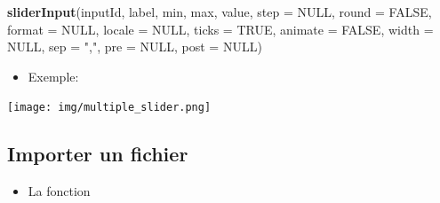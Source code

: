 \documentclass[
]{article}
\newenvironment{Shaded}{\begin{snugshade}}{\end{snugshade}}
\newcommand{\AttributeTok}[1]{\textcolor[rgb]{0.13,0.29,0.53}{#1}}
\newcommand{\CommentTok}[1]{\textcolor[rgb]{0.56,0.35,0.01}{\textit{#1}}}
\newcommand{\ConstantTok}[1]{\textcolor[rgb]{0.56,0.35,0.01}{#1}}
\newcommand{\DecValTok}[1]{\textcolor[rgb]{0.00,0.00,0.81}{#1}}
\newcommand{\FunctionTok}[1]{\textcolor[rgb]{0.13,0.29,0.53}{\textbf{#1}}}
\newcommand{\NormalTok}[1]{#1}
\newcommand{\StringTok}[1]{\textcolor[rgb]{0.31,0.60,0.02}{#1}}
\providecommand{\tightlist}{%
  \setlength{\itemsep}{0pt}\setlength{\parskip}{0pt}}
\begin{document}
\begin{Shaded}
\begin{Highlighting}[]
\FunctionTok{sliderInput}\NormalTok{(inputId, label, min, max, value, }\AttributeTok{step =} \ConstantTok{NULL}\NormalTok{, }\AttributeTok{round =} \ConstantTok{FALSE}\NormalTok{,}
            \AttributeTok{format =} \ConstantTok{NULL}\NormalTok{, }\AttributeTok{locale =} \ConstantTok{NULL}\NormalTok{, }\AttributeTok{ticks =} \ConstantTok{TRUE}\NormalTok{, }\AttributeTok{animate =} \ConstantTok{FALSE}\NormalTok{,}
            \AttributeTok{width =} \ConstantTok{NULL}\NormalTok{, }\AttributeTok{sep =} \StringTok{","}\NormalTok{, }\AttributeTok{pre =} \ConstantTok{NULL}\NormalTok{, }\AttributeTok{post =} \ConstantTok{NULL}\NormalTok{)}
\end{Highlighting}
\end{Shaded}

\begin{itemize}
\tightlist
\item
  Exemple:
\end{itemize}

\begin{Shaded}
\end{Shaded}

\texttt{[image: img/multiple\_slider.png]}

\hypertarget{importer-un-fichier}{%
\subsection{Importer un fichier}\label{importer-un-fichier}}

\begin{itemize}
\tightlist
\item
  La fonction
\end{itemize}
\end{document}

